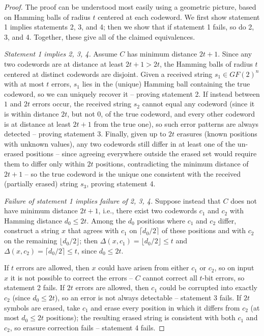 \begin{proof}
The proof can be understood most easily using a geometric picture, based on Hamming balls of radius \(t\) centered at each codeword. We first show statement 1 implies statements 2, 3, and 4; then we show that if statement 1 fails, so do 2, 3, and 4. Together, these give all of the claimed equivalences.

\emph{Statement 1 implies 2, 3, 4.} Assume \(C\) has minimum distance \(2t+1\). Since any two codewords are at distance at least \(2t+1 > 2t\), the Hamming balls of radius \(t\) centered at distinct codewords are disjoint. Given a received string \(s_1 \in GF(2)^n\) with at most \(t\) errors, \(s_1\) lies in the (unique) Hamming ball containing the true codeword, so we can uniquely recover it -- proving statement 2. If instead between \(1\) and \(2t\) errors occur, the received string \(s_2\) cannot equal any codeword (since it is within distance \(2t\), but not \(0\), of the true codeword, and every other codeword is at distance at least \(2t+1\) from the true one), so such error patterns are always detected -- proving statement 3. Finally, given up to \(2t\) erasures (known positions with unknown values), any two codewords still differ in at least one of the un-erased positions -- since agreeing everywhere outside the erased set would require them to differ only within \(2t\) positions, contradicting the minimum distance of \(2t+1\) -- so the true codeword is the unique one consistent with the received (partially erased) string \(s_3\), proving statement 4.

\emph{Failure of statement 1 implies failure of 2, 3, 4.} Suppose instead that \(C\) does not have minimum distance \(2t+1\), i.e., there exist two codewords \(c_1\) and \(c_2\) with Hamming distance \(d_0 \leq 2t\). Among the \(d_0\) positions where \(c_1\) and \(c_2\) differ, construct a string \(x\) that agrees with \(c_1\) on \(\lceil d_0/2 \rceil\) of these positions and with \(c_2\) on the remaining \(\lfloor d_0/2 \rfloor\); then \(\Delta(x, c_1) = \lfloor d_0/2 \rfloor \leq t\) and \(\Delta(x, c_2) = \lceil d_0/2 \rceil \leq t\), since \(d_0 \le 2t\).

If \(t\) errors are allowed, then \(x\) could have arisen from either \(c_1\) or \(c_2\), so on input \(x\) it is not possible to correct the errors -- \(C\) cannot correct all \(t\)-bit errors, so statement 2 fails. If \(2t\) errors are allowed, then \(c_1\) could be corrupted into exactly \(c_2\) (since \(d_0 \le 2t\)), so an error is not always detectable -- statement 3 fails. If \(2t\) symbols are erased, take \(c_1\) and erase every position in which it differs from \(c_2\) (at most \(d_0 \leq 2t\) positions); the resulting erased string is consistent with both \(c_1\) and \(c_2\), so erasure correction fails -- statement 4 fails.
\end{proof}

